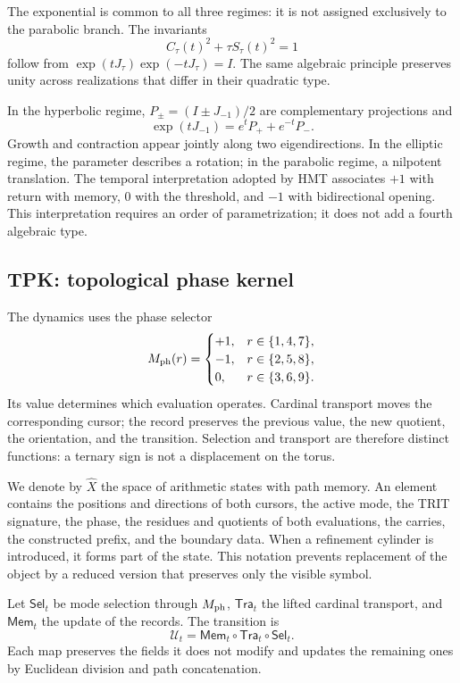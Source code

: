 The exponential is common to all three regimes: it is not assigned exclusively to the parabolic branch. The invariants
\[
 C_\tau(t)^2+\tau S_\tau(t)^2=1
\]
follow from \(\exp(tJ_\tau)\exp(-tJ_\tau)=I\). The same algebraic principle preserves unity across realizations that differ in their quadratic type.

In the hyperbolic regime, \(P_\pm=(I\pm J_{-1})/2\) are complementary projections and
\[
 \exp(tJ_{-1})=e^tP_++e^{-t}P_-.
\]
Growth and contraction appear jointly along two eigendirections. In the elliptic regime, the parameter describes a rotation; in the parabolic regime, a nilpotent translation. The temporal interpretation adopted by HMT associates \(+1\) with return with memory, \(0\) with the threshold, and \(-1\) with bidirectional opening. This interpretation requires an order of parametrization; it does not add a fourth algebraic type.





\subsection{TPK: topological phase kernel}

The dynamics uses the phase selector
\[
 M_{\rm ph}(r)=
 \begin{cases}
 +1,&r\in\{1,4,7\},\\
 -1,&r\in\{2,5,8\},\\
 0,&r\in\{3,6,9\}.
 \end{cases}
\]
Its value determines which evaluation operates. Cardinal transport moves the corresponding cursor; the record preserves the previous value, the new quotient, the orientation, and the transition. Selection and transport are therefore distinct functions: a ternary sign is not a displacement on the torus.

We denote by \(\widehat X\) the space of arithmetic states with path memory. An element contains the positions and directions of both cursors, the active mode, the TRIT signature, the phase, the residues and quotients of both evaluations, the carries, the constructed prefix, and the boundary data. When a refinement cylinder is introduced, it forms part of the state. This notation prevents replacement of the object by a reduced version that preserves only the visible symbol.

\begin{definition}
Let \(\mathsf{Sel}_t\) be mode selection through \(M_{\rm ph}\), \(\mathsf{Tra}_t\) the lifted cardinal transport, and \(\mathsf{Mem}_t\) the update of the records. The transition is
\begin{equation}
 \mathcal U_t=\mathsf{Mem}_t\circ\mathsf{Tra}_t\circ\mathsf{Sel}_t.
 \label{eq:actualizacion}
\end{equation}
Each map preserves the fields it does not modify and updates the remaining ones by Euclidean division and path concatenation.
\end{definition}

